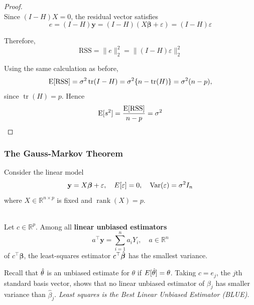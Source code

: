 \begin{proof}\leavevmode\\
    Since $(I-H)X=0$, the residual vector satisfies
    \begin{equation*}
        e = (I-H)\mathbf{y} = (I-H)(X\bm\beta+\varepsilon) = (I-H)\varepsilon
    \end{equation*}

    Therefore,
    \begin{equation*}
        \text{RSS} = \lVert e \rVert_2^2 = \lVert (I-H)\varepsilon \rVert_2^2
    \end{equation*}

    Using the same calculation as before,
    \begin{equation*}
        \operatorname{E}[\text{RSS}] = \sigma^2\operatorname{tr}(I-H) = \sigma^2\{n-\operatorname{tr}(H)\} = \sigma^2(n-p),
    \end{equation*}
    since $\operatorname{tr}(H)=p$. Hence
    \begin{equation*}
        \operatorname{E}[s^2] = \frac{\operatorname{E}[\text{RSS}]}{n-p} = \sigma^2
    \end{equation*}
\end{proof}

\subsubsection{The Gauss-Markov Theorem}
Consider the linear model
\begin{equation*}
    \mathbf{y} = X\bm\beta + \varepsilon, \quad E[\varepsilon]=0, \quad \operatorname{Var}(\varepsilon)=\sigma^2I_n
\end{equation*}
where $X \in \mathbb{R}^{n \times p}$ is fixed and $\operatorname{rank}(X)=p$.
\begin{theorem} \leavevmode\\
    Let $c \in \mathbb{R}^p$. Among all \textbf{linear unbiased estimators}
    \begin{equation*}
        a^\top \mathbf{y} = \sum_{i=1}^{n}a_iY_i, \quad a \in \mathbb{R}^n
    \end{equation*}
    of $c^\top \bm\beta$, the least-squares estimator $c^\top \hat{\bm\beta}$ has the smallest variance.
\end{theorem}

Recall that $\hat\theta$ is an unbiased estimate for $\theta$ if $E[\hat\theta]=\theta$. Taking $c=e_j$, the $j$th standard basis vector, shows that no linear unbiased estimator of $\beta_j$ has smaller variance than $\hat\beta_j$. \textit{Least squares is the Best Linear Unbiased Estimator (BLUE)}.

